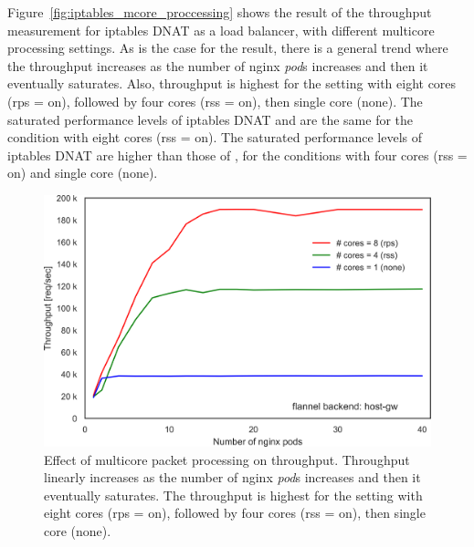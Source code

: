 Figure~\ref{fig:iptables_mcore_proccessing} shows the result of the throughput measurement for iptables DNAT as a load balancer, with different multicore processing settings.
As is the case for the  result, there is a general trend where the throughput increases as the number of nginx {\em pod}s increases and then it eventually saturates.
Also, throughput is highest for the setting with eight cores (rps = on), followed by four cores (rss = on), then single core (none).
%
The saturated performance levels of iptables DNAT and  are the same for the condition with eight cores (rss = on). 
The saturated performance levels of iptables DNAT are higher than those of , for the conditions with four cores (rss = on) and single core (none).

\begin{figure}[h]
  \centering
  \includegraphics[width=0.75\columnwidth]{Figs/ipvs_mcore_proccessing}
  \par\bigskip
  \centering
  \begin{minipage}{0.9\columnwidth}
    \caption[Effect of multicore packet processing on IPVS throughput]{
Effect of multicore packet processing on  throughput.
Throughput linearly increases as the number of nginx {\em pod}s increases and then it eventually saturates.
The throughput is highest for the setting with eight cores (rps = on), followed by four cores (rss = on), then single core (none).
    }
    \label{fig:ipvs_mcore_proccessing}
  \end{minipage}
\end{figure}


